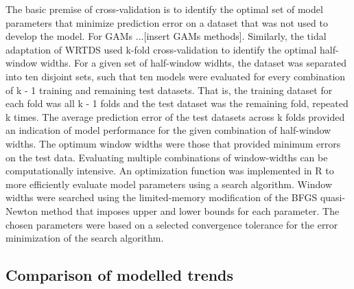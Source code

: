 \documentclass[letterpaper,12pt,oneside]{article}\usepackage[]{graphicx}\usepackage[]{color}
\begin{document}
The basic premise of cross-validation is to identify the optimal set of model parameters that minimize prediction error on a dataset that was not used to develop the model.  For \acp{GAM} \citep{Hastie90,Zuur12}...[insert GAMs methods]. Similarly, the tidal adaptation of \ac{WRTDS} used k-fold cross-validation to identify the optimal half-window widths. For a given set of half-window widhts, the dataset was separated into ten disjoint sets, such that ten models were evaluated for every combination of k - 1 training and remaining test datasets. That is, the training dataset for each fold was all k - 1 folds and the test dataset was the remaining fold, repeated k times. The average prediction error of the test datasets across k folds provided an indication of model performance for the given combination of half-window widths.  The optimum window widths were those that provided minimum errors on the test data.  Evaluating multiple combinations of window-widths can be computationally intensive. An optimization function was implemented in R  \citep{Byrd95,RDCT15} to more efficiently evaluate model parameters using a search algorithm.  Window widths were searched using the limited-memory modification of the BFGS quasi-Newton method that imposes upper and lower bounds for each parameter.  The chosen parameters were based on a selected convergence tolerance for the error minimization of the search algorithm.  

\subsection{Comparison of modelled trends}
\end{document}
